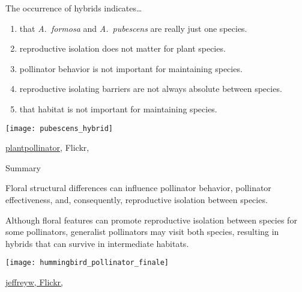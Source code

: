 \documentclass[t,hidelinks]{beamer}
\newcommand{\ques}[1]{\highlight{\textsc{q#1:}}}
\begin{document}
%
\begin{frame}[t]{\ques{11} The occurrence of hybrids indicates\dots}
	
	\begin{multicols}{2}
	\begin{enumerate}
		\item that \textit{A.~formosa} and \textit{A.~pubescens} are really just one species.
		\item reproductive isolation does not matter for plant species.
		\item pollinator behavior is not important for maintaining species.
		\item \alert<2>{reproductive isolating barriers are not always absolute between species.}
		\item that habitat is not important for maintaining species.
	\end{enumerate}
	
	\columnbreak
	
		\texttt{[image: pubescens\_hybrid]}
	\end{multicols}
	
	\vfilll
	
	\hfill \tiny \href{https://www.flickr.com/photos/63093099@N02/32184751505/in/photolist-R34gjH}{plantpollinator}, Flickr, 
\end{frame}
%
\begin{frame}[t]{Summary}
	
	\begin{multicols}{2}
	\hangpara Floral structural differences can influence pollinator behavior, pollinator effectiveness, and, consequently, reproductive isolation between species. 

	\hangpara Although floral features can promote reproductive isolation between species for some pollinators, generalist pollinators may visit both species, resulting in hybrids that can survive in intermediate habitats. 

	\columnbreak
	
		\texttt{[image: hummingbird\_pollinator\_finale]}
	\end{multicols}

	\vfilll
	
	\hfill \tiny \href{https://www.flickr.com/photos/jeffreyww/17421811000/in/photolist-egCnAb-W5cqTb-JmQo5J-NYPC2-7Tve9a-aCd9bM-7YoLY2-eeKix9-dhnGmv-nh85vv-sAP76s-6PkrUP-6r6qhK-driKBF-drdFtw-WS8wEY-drdwbv-7Ys1Pu-7YoLMx-egwBPz-9L5NHb-sqRuEw-sUo69r-9L5NHU-f9MG8d-RUtzU5-sxvkrJ-exZVce-sUcJns-rSeypr-oim7rn-drdzeb}{jeffreyw, Flickr, }
\end{frame}
%
\end{document}
